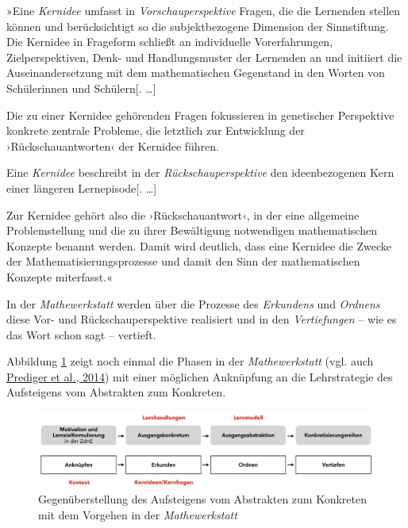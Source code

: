 \documentclass[
  ngerman,
]{scrbook}
\theoremstyle{definition}
\theoremstyle{definition}
\theoremstyle{definition}
\theoremstyle{definition}
\theoremstyle{remark}
\begin{document}
»Eine \emph{Kernidee} umfasst in \emph{Vorschauperspektive} Fragen, die die Lernenden stellen können und berücksichtigt so die subjektbezogene Dimension der Sinnstiftung. Die Kernidee in Frageform schließt an individuelle Vorerfahrungen, Zielperspektiven, Denk- und Handlungsmuster der Lernenden an und initiiert die Auseinandersetzung mit dem mathematischen Gegenstand in den Worten von Schülerinnen und Schülern{[}. \ldots{]}

Die zu einer Kernidee gehörenden Fragen fokussieren in genetischer Perspektive konkrete zentrale Probleme, die letztlich zur Entwicklung der ›Rückschauantworten‹ der Kernidee führen.

Eine \emph{Kernidee} beschreibt in der \emph{Rückschauperspektive} den ideenbezogenen Kern einer längeren Lernepisode{[}. \ldots{]}

Zur Kernidee gehört also die ›Rückschauantwort‹, in der eine allgemeine Problemstellung und die zu ihrer Bewältigung notwendigen mathematischen Konzepte benannt werden. Damit wird deutlich, dass eine Kernidee die Zwecke der Mathematisierungsprozesse und damit den Sinn der mathematischen Konzepte miterfasst.«

In der \emph{Mathewerkstatt} werden über die Prozesse des \emph{Erkundens} und \emph{Ordnens} diese Vor- und Rückschauperspektive realisiert und in den \emph{Vertiefungen} -- wie es das Wort schon sagt -- vertieft.

Abbildung \ref{fig:AKMathewerkstatt} zeigt noch einmal die Phasen in der \emph{Mathewerkstatt} (vgl. auch \protect\hyperlink{ref-Prediger2014}{Prediger et al., 2014}) mit einer möglichen Anknüpfung an die Lehrstrategie des Aufsteigens vom Abstrakten zum Konkreten.



\begin{figure}

{\centering \includegraphics[width=1\linewidth]{pictures/7-Vergleich} 

}

\caption{Gegenüberstellung des Aufsteigens vom Abstrakten zum Konkreten mit dem Vorgehen in der \emph{Mathewerkstatt}}\label{fig:AKMathewerkstatt}
\end{figure}
\end{document}
